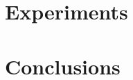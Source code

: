 \documentclass[conference]{IEEEtran}
\begin{document}
\section{Experiments}



\section{Conclusions}



\begin{thebibliography}{00}
\end{thebibliography}
\vspace{12pt}
\color{red}
\end{document}
